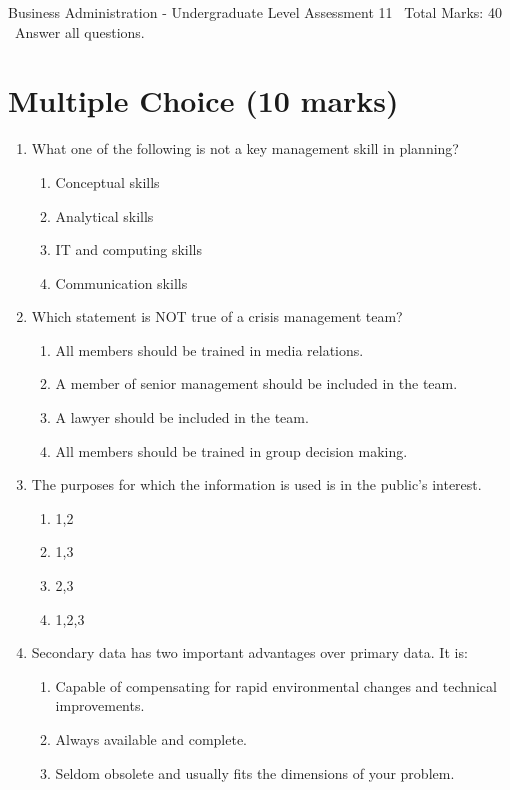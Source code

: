 \documentclass[12pt]{article}
\begin{document}
\begin{center}
Business Administration - Undergraduate Level Assessment 11 \
Total Marks: 40 \
Answer all questions.
\end{center}

\section*{Multiple Choice (10 marks)}
\begin{enumerate}[label=\arabic*.]
\item What one of the following is not a key management skill in planning?
\begin{enumerate}[label=(\alph*)]
    \item Conceptual skills
    \item Analytical skills
    \item IT and computing skills
    \item Communication skills
\end{enumerate}
\item Which statement is NOT true of a crisis management team?
\begin{enumerate}[label=(\alph*)]
    \item All members should be trained in media relations.
    \item A member of senior management should be included in the team.
    \item A lawyer should be included in the team.
    \item All members should be trained in group decision making.
\end{enumerate}
\item The purposes for which the information is used is in the public's interest.
\begin{enumerate}[label=(\alph*)]
    \item 1,2
    \item 1,3
    \item 2,3
    \item 1,2,3
\end{enumerate}
\item Secondary data has two important advantages over primary data. It is:
\begin{enumerate}[label=(\alph*)]
    \item Capable of compensating for rapid environmental changes and technical improvements.
    \item Always available and complete.
    \item Seldom obsolete and usually fits the dimensions of your problem.

\end{enumerate}
\end{enumerate}
\end{document}
